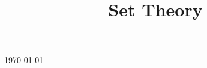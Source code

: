 

\title{Set Theory}

\usepackage[sort=standard]{glossaries} 
\makeglossaries



\maketitle
\centerline{\today}
\tableofcontents







